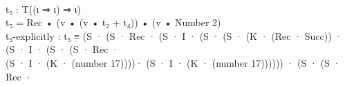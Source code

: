 \documentclass{entcs} \usepackage{prentcsmacro}
\newcommand{\AgdaFontStyle}[1]{\textsf{#1}}
\newcommand{\AgdaNumber}      [1]{\textcolor{AgdaNumber}{#1}}
\newcommand{\AgdaSymbol}      [1]{\textcolor{AgdaSymbol}{#1}}
\newcommand{\AgdaInductiveConstructor}[1]
    {\AgdaFontStyle{\textcolor{AgdaInductiveConstructor}{#1}}}
\newcommand{\AgdaDatatype} [1]{\AgdaFontStyle{\textcolor{AgdaDatatype}{#1}}}
\newcommand{\AgdaFunction} [1]{\AgdaFontStyle{\textcolor{AgdaFunction}{#1}}}
\newcommand{\AgdaIndent}[1]{\quad}
\newcommand{\AgdaCodeStyle}{\small}
\newenvironment{code}%
{\noindent\AgdaCodeStyle\pboxed}%
{\endpboxed\par\noindent%
\ignorespacesafterend}
\begin{document}
\begin{code}\>\>[0]\AgdaIndent{1}{}\<[1]%
\>[1]\<%
\\
\>\AgdaFunction{t₅} \AgdaSymbol{:} \AgdaDatatype{T}\AgdaSymbol{((}\AgdaInductiveConstructor{ι} \AgdaInductiveConstructor{⇒} \AgdaInductiveConstructor{ι}\AgdaSymbol{)} \AgdaInductiveConstructor{⇒} \AgdaInductiveConstructor{ι}\AgdaSymbol{)} \<[20]%
\>[20]\<%
\\
\>\AgdaFunction{t₅} \AgdaSymbol{=} \AgdaInductiveConstructor{Rec} \AgdaFunction{•} \AgdaSymbol{(}\AgdaFunction{v} \AgdaFunction{•} \AgdaSymbol{(}\AgdaFunction{v} \AgdaFunction{•} \AgdaFunction{t₂} \AgdaFunction{+} \AgdaFunction{t₄}\AgdaSymbol{))} \AgdaFunction{•} \AgdaSymbol{(}\AgdaFunction{v} \AgdaFunction{•} \AgdaFunction{Number} \AgdaNumber{2}\AgdaSymbol{)} \<[48]%
\>[48]\<%
\\
\>\AgdaFunction{t₅-explicitly} \AgdaSymbol{:} \AgdaFunction{t₅} \AgdaDatatype{≡} \AgdaSymbol{(}\AgdaInductiveConstructor{S} \AgdaInductiveConstructor{·} \AgdaSymbol{(}\AgdaInductiveConstructor{S} \AgdaInductiveConstructor{·} \AgdaInductiveConstructor{Rec} \AgdaInductiveConstructor{·} \AgdaSymbol{(}\AgdaInductiveConstructor{S} \AgdaInductiveConstructor{·} \AgdaFunction{I} \AgdaInductiveConstructor{·} \AgdaSymbol{(}\AgdaInductiveConstructor{S} \AgdaInductiveConstructor{·} \AgdaSymbol{(}\AgdaInductiveConstructor{S} \AgdaInductiveConstructor{·} \AgdaSymbol{(}\AgdaInductiveConstructor{K} \AgdaInductiveConstructor{·} \AgdaSymbol{(}\AgdaInductiveConstructor{Rec} \AgdaInductiveConstructor{·} \AgdaInductiveConstructor{Succ}\AgdaSymbol{))} \AgdaInductiveConstructor{·} \AgdaSymbol{(}\AgdaInductiveConstructor{S} \AgdaInductiveConstructor{·} \AgdaFunction{I} \AgdaInductiveConstructor{·} \AgdaSymbol{(}\AgdaInductiveConstructor{S} \AgdaInductiveConstructor{·} \AgdaSymbol{(}\AgdaInductiveConstructor{S} \AgdaInductiveConstructor{·} \AgdaInductiveConstructor{Rec} \AgdaInductiveConstructor{·}\<%
\\
\>[0]\AgdaIndent{21}{}\<[21]%
\>[21]\AgdaSymbol{(}\AgdaInductiveConstructor{S} \AgdaInductiveConstructor{·} \AgdaFunction{I} \AgdaInductiveConstructor{·} \AgdaSymbol{(}\AgdaInductiveConstructor{K} \AgdaInductiveConstructor{·} \AgdaSymbol{(}\AgdaFunction{number} \AgdaNumber{17}\AgdaSymbol{))))}\AgdaInductiveConstructor{·} \AgdaSymbol{(}\AgdaInductiveConstructor{S} \AgdaInductiveConstructor{·} \AgdaFunction{I} \AgdaInductiveConstructor{·} \AgdaSymbol{(}\AgdaInductiveConstructor{K} \AgdaInductiveConstructor{·} \AgdaSymbol{(}\AgdaFunction{number} \AgdaNumber{17}\AgdaSymbol{))))))} \AgdaInductiveConstructor{·} \AgdaSymbol{(}\AgdaInductiveConstructor{S} \AgdaInductiveConstructor{·} \AgdaSymbol{(}\AgdaInductiveConstructor{S} \AgdaInductiveConstructor{·} \AgdaInductiveConstructor{Rec} \AgdaInductiveConstructor{·} \<[100]%

\end{code}
\end{document}
